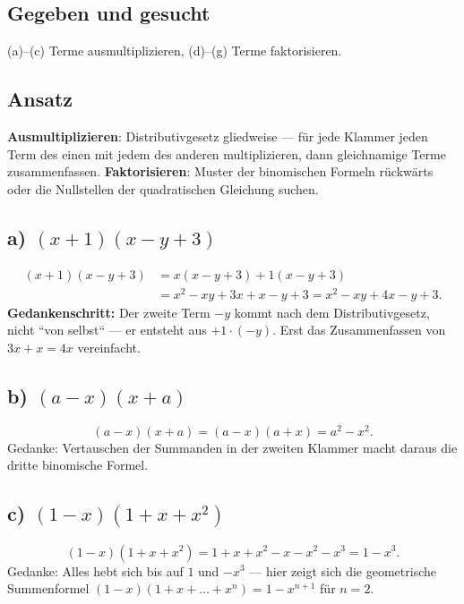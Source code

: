 

\subsection*{Gegeben und gesucht}
(a)--(c) Terme ausmultiplizieren, (d)--(g) Terme faktorisieren.

\subsection*{Ansatz}
\textbf{Ausmultiplizieren}: Distributivgesetz gliedweise --- für jede
Klammer jeden Term des einen mit jedem des anderen multiplizieren, dann
gleichnamige Terme zusammenfassen. \textbf{Faktorisieren}: Muster der
binomischen Formeln rückwärts oder die Nullstellen der quadratischen
Gleichung suchen.

\subsection*{a) $(x+1)(x-y+3)$}
\begin{align}
  (x+1)(x-y+3)
  &=x(x-y+3)+1(x-y+3) \\
  &=x^2-xy+3x+x-y+3
  =x^2-xy+4x-y+3 .
\end{align}
\textbf{Gedankenschritt:} Der zweite Term $-y$ kommt nach dem
Distributivgesetz, nicht ``von selbst`` --- er entsteht aus
$+1\cdot(-y)$. Erst das Zusammenfassen von $3x+x=4x$ vereinfacht.

\subsection*{b) $(a-x)(x+a)$}
\begin{equation}
  (a-x)(x+a)=(a-x)(a+x)=a^2-x^2 .
\end{equation}
Gedanke: Vertauschen der Summanden in der zweiten Klammer macht daraus
die dritte binomische Formel.

\subsection*{c) $(1-x)(1+x+x^2)$}
\begin{equation}
  (1-x)(1+x+x^2)=1+x+x^2-x-x^2-x^3=1-x^3 .
\end{equation}
Gedanke: Alles hebt sich bis auf $1$ und $-x^3$ --- hier zeigt sich die
geometrische Summenformel $(1-x)(1+x+\dots+x^{n})=1-x^{n+1}$ für $n=2$.

